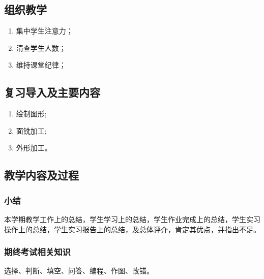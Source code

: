 \jxhj{%
	}

\makeshouye %

\subsection{组织教学}
\begin{enumerate}[\hspace{2em}1、]
	\item 集中学生注意力；
	\item 清查学生人数；
	\item 维持课堂纪律；
\end{enumerate}
\subsection{复习导入及主要内容}
\begin{enumerate}[1、]
	\item 绘制图形;
	\item 面铣加工;
	\item 外形加工。
\end{enumerate}


\subsection{教学内容及过程}
\subsubsection{小结}
本学期教学工作上的总结，学生学习上的总结，学生作业完成上的总结，学生实习操作上的总结，学生实习报告上的总结，及总体评介，肯定其优点，并指出不足。
\subsubsection{期终考试相关知识}
选择、判断、填空、问答、编程、作图、改错。
